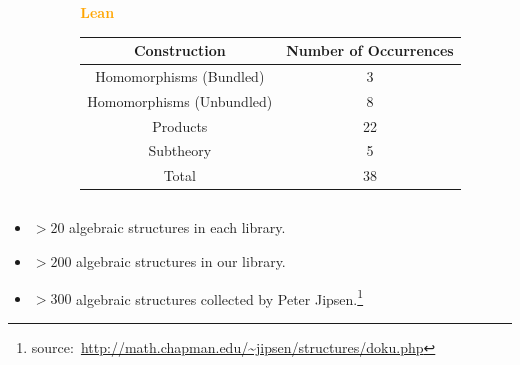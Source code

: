 \documentclass[t,10pt,numbers,fleqn,usenames,xcolor=dvipsnames]{beamer}
\begin{document}
\begin{frame}[fragile]
\begin{columns}
\begin{column}{0.45\textwidth}
\end{column} 
\begin{column}{0.45\textwidth}
\textcolor{Orange}{\textbf{Lean}}
\begin{table}
\begin{adjustbox}{width=0.9\columnwidth}
\begin{tabular}{| c || c |}
\hline 
\textbf{Construction} & \textbf{Number of Occurrences} \\ \hline 
Homomorphisms (Bundled) & 3 \\ \hline
Homomorphisms (Unbundled)& 8  \\ \hline
Products & 22 \\ \hline
Subtheory & 5 \\ \hline\hline 
Total & 38 \\ \hline 
\end{tabular}
\end{adjustbox}
\end{table} 
\end{column} 
\end{columns}
\begin{itemize}
\item $> 20$ algebraic structures in each library.
\pause  
\item $>200$ algebraic structures in our library.
\item $>300$ algebraic structures collected by Peter Jipsen.\only<+->\footnote{source:~\url{http://math.chapman.edu/~jipsen/structures/doku.php}}
\end{itemize}
\end{frame}
\end{document}
